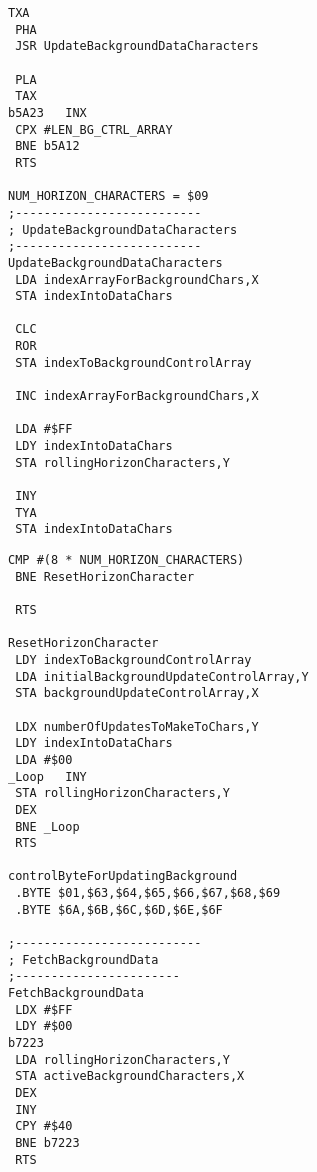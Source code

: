 \begin{minipage}[b]{0.33\linewidth}
\begin{lrbox}{\mybox}
\begin{lstlisting}[basicstyle=\ttfamily\tiny]
 TXA 
 PHA 
 JSR UpdateBackgroundDataCharacters

 PLA 
 TAX 
b5A23   INX 
 CPX #LEN_BG_CTRL_ARRAY
 BNE b5A12
 RTS 

NUM_HORIZON_CHARACTERS = $09
;--------------------------
; UpdateBackgroundDataCharacters
;--------------------------
UpdateBackgroundDataCharacters   
 LDA indexArrayForBackgroundChars,X
 STA indexIntoDataChars

 CLC 
 ROR 
 STA indexToBackgroundControlArray

 INC indexArrayForBackgroundChars,X

 LDA #$FF
 LDY indexIntoDataChars
 STA rollingHorizonCharacters,Y

 INY 
 TYA 
 STA indexIntoDataChars
\end{lstlisting}
\end{lrbox}%
\scalebox{0.7}{\usebox{\mybox}}
\end{minipage}
\hspace{-0.8cm}
\begin{minipage}[b]{0.33\linewidth}
\begin{lrbox}{\mybox}%
\begin{lstlisting}[basicstyle=\ttfamily\tiny]
 CMP #(8 * NUM_HORIZON_CHARACTERS)
 BNE ResetHorizonCharacter

 RTS 

ResetHorizonCharacter   
 LDY indexToBackgroundControlArray
 LDA initialBackgroundUpdateControlArray,Y
 STA backgroundUpdateControlArray,X

 LDX numberOfUpdatesToMakeToChars,Y
 LDY indexIntoDataChars
 LDA #$00
_Loop   INY 
 STA rollingHorizonCharacters,Y
 DEX 
 BNE _Loop
 RTS 

controlByteForUpdatingBackground   
 .BYTE $01,$63,$64,$65,$66,$67,$68,$69
 .BYTE $6A,$6B,$6C,$6D,$6E,$6F

;--------------------------
; FetchBackgroundData
;-----------------------
FetchBackgroundData   
 LDX #$FF
 LDY #$00
b7223   
 LDA rollingHorizonCharacters,Y
 STA activeBackgroundCharacters,X
 DEX 
 INY 
 CPY #$40
 BNE b7223
 RTS 
\end{lstlisting}
\end{lrbox}%
\scalebox{0.7}{\usebox{\mybox}}
\end{minipage}
